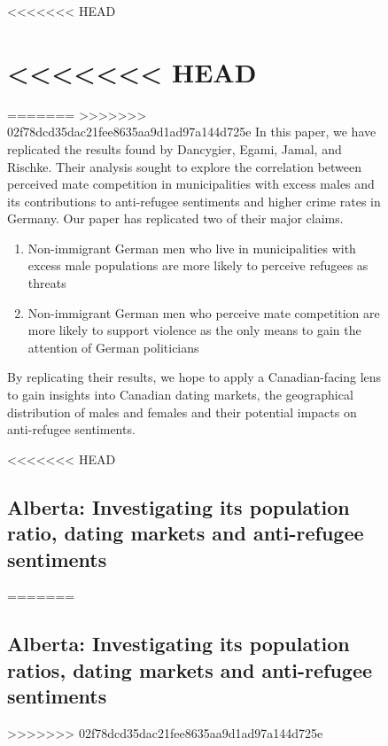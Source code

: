 \documentclass[
]{article}
\begin{document}
\begin{figure}
<<<<<<< HEAD
\hypertarget{head}{%
\section{\textless\textless\textless\textless\textless\textless\textless{}
HEAD}\label{head}}

=======
>>>>>>> 02f78dcd35dac21fee8635aa9d1ad97a144d725e
In this paper, we have replicated the results found by Dancygier, Egami,
Jamal, and Rischke. Their analysis sought to explore the correlation
between perceived mate competition in municipalities with excess males
and its contributions to anti-refugee sentiments and higher crime rates
in Germany. Our paper has replicated two of their major claims.

\begin{enumerate}
\def\labelenumi{(\arabic{enumi})}
\item
  Non-immigrant German men who live in municipalities with excess male
  populations are more likely to perceive refugees as threats~
\item
  Non-immigrant German men who perceive mate competition are more likely
  to support violence as the only means to gain the attention of German
  politicians
\end{enumerate}

By replicating their results, we hope to apply a Canadian-facing lens to
gain insights into Canadian dating markets, the geographical
distribution of males and females and their potential impacts on
anti-refugee sentiments.~

<<<<<<< HEAD
\hypertarget{alberta-investigating-its-population-ratio-dating-markets-and-anti-refugee-sentiments}{%
\subsection{Alberta: Investigating its population ratio, dating markets
and anti-refugee
sentiments}\label{alberta-investigating-its-population-ratio-dating-markets-and-anti-refugee-sentiments}}
=======
\hypertarget{alberta-investigating-its-population-ratios-dating-markets-and-anti-refugee-sentiments}{%
\subsection{Alberta: Investigating its population ratios, dating markets
and anti-refugee
sentiments}\label{alberta-investigating-its-population-ratios-dating-markets-and-anti-refugee-sentiments}}
>>>>>>> 02f78dcd35dac21fee8635aa9d1ad97a144d725e


\end{figure}
\end{document}
